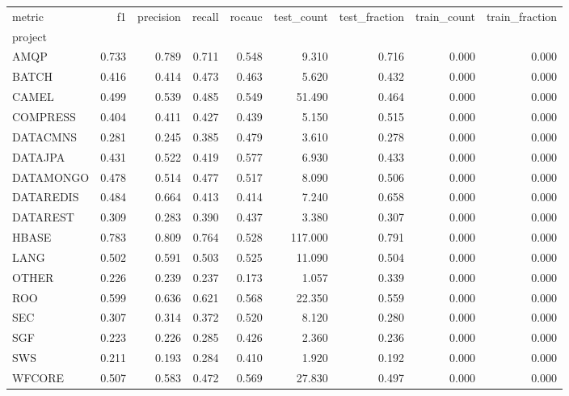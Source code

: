 \begin{tabular}{lrrrrrrrr}
\toprule
metric &    f1 &  precision &  recall &  rocauc &  test\_count &  test\_fraction &  train\_count &  train\_fraction \\
project   &       &            &         &         &             &                &              &                 \\
\midrule
AMQP      & 0.733 &      0.789 &   0.711 &   0.548 &       9.310 &          0.716 &        0.000 &           0.000 \\
BATCH     & 0.416 &      0.414 &   0.473 &   0.463 &       5.620 &          0.432 &        0.000 &           0.000 \\
CAMEL     & 0.499 &      0.539 &   0.485 &   0.549 &      51.490 &          0.464 &        0.000 &           0.000 \\
COMPRESS  & 0.404 &      0.411 &   0.427 &   0.439 &       5.150 &          0.515 &        0.000 &           0.000 \\
DATACMNS  & 0.281 &      0.245 &   0.385 &   0.479 &       3.610 &          0.278 &        0.000 &           0.000 \\
DATAJPA   & 0.431 &      0.522 &   0.419 &   0.577 &       6.930 &          0.433 &        0.000 &           0.000 \\
DATAMONGO & 0.478 &      0.514 &   0.477 &   0.517 &       8.090 &          0.506 &        0.000 &           0.000 \\
DATAREDIS & 0.484 &      0.664 &   0.413 &   0.414 &       7.240 &          0.658 &        0.000 &           0.000 \\
DATAREST  & 0.309 &      0.283 &   0.390 &   0.437 &       3.380 &          0.307 &        0.000 &           0.000 \\
HBASE     & 0.783 &      0.809 &   0.764 &   0.528 &     117.000 &          0.791 &        0.000 &           0.000 \\
LANG      & 0.502 &      0.591 &   0.503 &   0.525 &      11.090 &          0.504 &        0.000 &           0.000 \\
OTHER     & 0.226 &      0.239 &   0.237 &   0.173 &       1.057 &          0.339 &        0.000 &           0.000 \\
ROO       & 0.599 &      0.636 &   0.621 &   0.568 &      22.350 &          0.559 &        0.000 &           0.000 \\
SEC       & 0.307 &      0.314 &   0.372 &   0.520 &       8.120 &          0.280 &        0.000 &           0.000 \\
SGF       & 0.223 &      0.226 &   0.285 &   0.426 &       2.360 &          0.236 &        0.000 &           0.000 \\
SWS       & 0.211 &      0.193 &   0.284 &   0.410 &       1.920 &          0.192 &        0.000 &           0.000 \\
WFCORE    & 0.507 &      0.583 &   0.472 &   0.569 &      27.830 &          0.497 &        0.000 &           0.000 \\
\bottomrule
\end{tabular}
